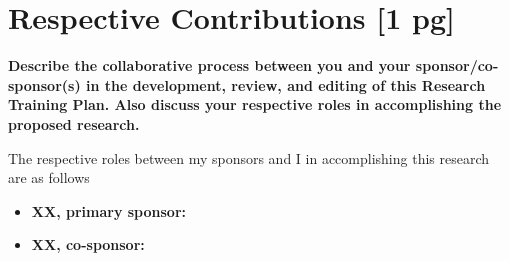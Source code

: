 \documentclass[11pt]{article}
\begin{document}
\section*{Respective Contributions [1 pg]}

\textbf{Describe the collaborative process between you and your sponsor/co-sponsor(s) in the development, review, and editing of this Research Training Plan. Also discuss your respective roles in accomplishing the proposed research.}

\lipsum[5-8]

The respective roles between my sponsors and I in accomplishing this research are as follows\begin{itemize}
	\item \textbf{XX, primary sponsor:} \lipsum[11-12]
	\item \textbf{XX, co-sponsor:} \lipsum[13-14]
	
\end{itemize}
\end{document}

